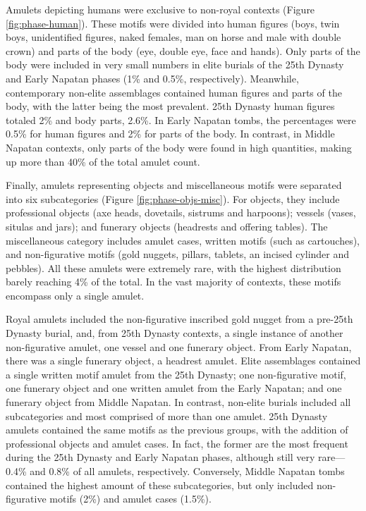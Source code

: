 Amulets depicting humans were exclusive to non-royal contexts (Figure \ref{fig:phase-human}). These motifs were divided into human figures (boys, twin boys, unidentified figures, naked females, man on horse and male with double crown) and parts of the body (eye, double eye, face and hands). Only parts of the body were included in very small numbers in elite burials of the 25th Dynasty and Early Napatan phases (1\% and 0.5\%, respectively). Meanwhile, contemporary non-elite assemblages contained human figures and parts of the body, with the latter being the most prevalent. 25th Dynasty human figures totaled 2\% and body parts, 2.6\%. In Early Napatan tombs, the percentages were 0.5\% for human figures and 2\% for parts of the body.  In contrast, in Middle Napatan contexts, only parts of the body were found in high quantities, making up more than 40\% of the total amulet count.


Finally, amulets representing objects and miscellaneous motifs were separated into six subcategories (Figure \ref{fig:phase-objs-misc}). For objects, they include professional objects (axe heads, dovetails, sistrums and harpoons); vessels (vases, situlas and jars); and funerary objects (headrests and offering tables). The miscellaneous category includes amulet cases, written motifs (such as cartouches), and non-figurative motifs (gold nuggets, pillars, tablets, an incised cylinder and pebbles). All these amulets were extremely rare, with the highest distribution barely reaching 4\% of the total. In the vast majority of contexts, these motifs encompass only a single amulet.


Royal amulets included the non-figurative inscribed gold nugget from a pre-25th Dynasty burial, and, from 25th Dynasty contexts, a single instance of another non-figurative amulet, one vessel and one funerary object. From Early Napatan, there was a single funerary object, a headrest amulet. Elite assemblages contained a single written motif amulet from the 25th Dynasty; one non-figurative motif, one funerary object and one written amulet from the Early Napatan; and one funerary object from Middle Napatan. In contrast, non-elite burials included all subcategories and most comprised of more than one amulet. 25th Dynasty amulets contained the same motifs as the previous groups, with the addition of professional objects and amulet cases. In fact, the former are the most frequent during the 25th Dynasty and Early Napatan phases, although still very rare---0.4\% and 0.8\% of all amulets, respectively. Conversely, Middle Napatan tombs contained the highest amount of these subcategories, but only included non-figurative motifs (2\%) and amulet cases (1.5\%).


